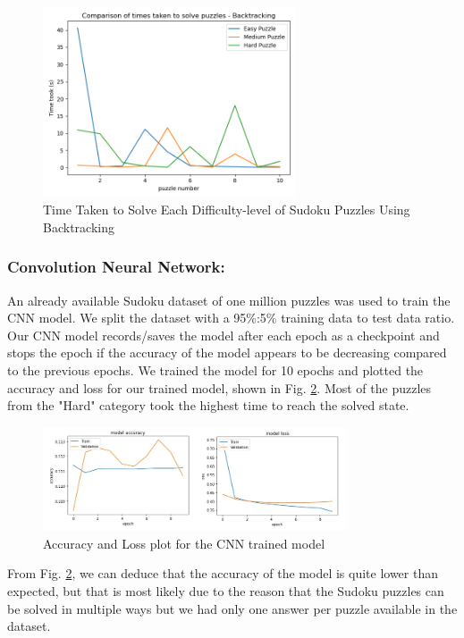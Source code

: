 \begin{figure} [htbp]
\centering
\includegraphics[width=75mm,scale=1]{figures/Backtracking.png}
\caption{Time Taken to Solve Each Difficulty-level of Sudoku Puzzles Using Backtracking}
\label{fig:backtrack_time}
\end{figure}

\subsubsection{Convolution Neural Network:}
An already available Sudoku dataset \cite{bib_cnndataset} of one million puzzles was used to train the CNN model. We split the dataset with a 95\%:5\% training data to test data ratio. Our CNN model records/saves the model after each epoch as a checkpoint and stops the epoch if the accuracy of the model appears to be decreasing compared to the previous epochs. We trained the model for 10 epochs and plotted the accuracy and loss for our trained model, shown in Fig. \ref{fig:accuracy_loss}. Most of the puzzles from the "Hard" category took the highest time to reach the solved state.

\begin{figure} [htbp]
\centering
\includegraphics[width=90mm,scale=1.2]{figures/accuracy_loss.jpg}
\caption{Accuracy and Loss plot for the CNN trained model}
\label{fig:accuracy_loss}
\end{figure}
 

From Fig. \ref{fig:accuracy_loss}, we can deduce that the accuracy of the model is quite lower than expected, but that is most likely due to the reason that the Sudoku puzzles can be solved in multiple ways but we had only one answer per puzzle available in the dataset.

